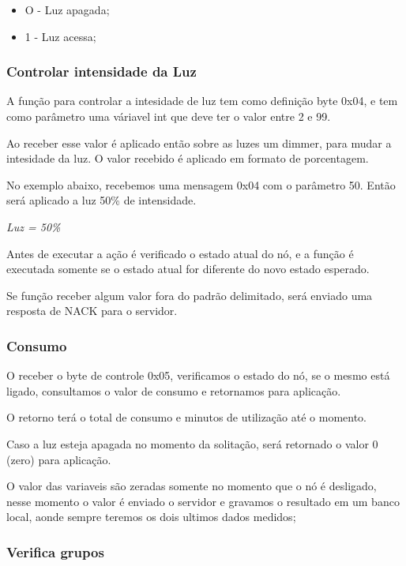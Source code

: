 \documentclass[openright]{normas-utf-tex} %
\begin{document}
\begin{itemize}
    \item O - Luz apagada;
    \item 1 - Luz acessa;
\end{itemize}

\subsubsection{Controlar intensidade da Luz}
A função para controlar a intesidade de luz tem como definição byte 0x04, e tem como parâmetro uma váriavel int que deve ter o valor entre 2 e 99.

Ao receber esse valor é aplicado então sobre as luzes um dimmer, para mudar a intesidade da luz. O valor recebido é aplicado em formato de porcentagem.

No exemplo abaixo, recebemos uma mensagem 0x04 com o parâmetro 50. Então será aplicado a luz 50\% de intensidade.

\begin{center}
    \textit{
    Luz =  50\%
    }
\end{center}

Antes de executar a ação é verificado o estado atual do nó, e a função é executada somente se o estado atual for diferente do novo estado esperado.

Se função receber algum valor fora do padrão delimitado, será enviado uma resposta de NACK para o servidor.

\subsubsection{Consumo}
O receber o byte de controle 0x05, verificamos o estado do nó, se o mesmo está ligado, consultamos o valor de consumo e retornamos para aplicação.

O retorno terá o total de consumo e minutos de utilização até o momento.

Caso a luz esteja apagada no momento da solitação, será retornado o valor 0 (zero) para aplicação.

O valor das variaveis são zeradas somente no momento que o nó é desligado, nesse momento o valor é enviado o servidor e gravamos o resultado em um banco local, aonde sempre teremos os dois ultimos dados medidos;

\subsubsection{Verifica grupos}
\end{document}
